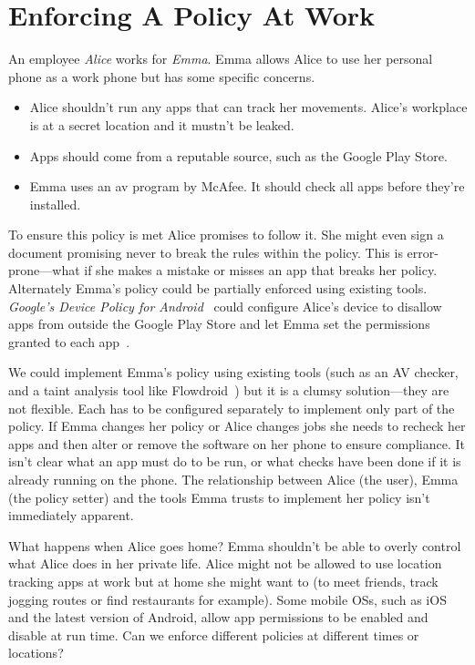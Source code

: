 \documentclass[]{llncs}
\begin{document}
\section{Enforcing A Policy At Work}
\label{sec:problem}

An employee \emph{Alice} works for \emph{Emma}.
Emma allows Alice to use her personal phone as a work phone but has some specific concerns.
\begin{itemize}
  \item Alice shouldn't run any apps that can track her movements.
    Alice's workplace is at a secret location and it mustn't be leaked.
  \item Apps should come from a reputable source, such as the Google Play Store.
  \item Emma uses an \ac{av} program by McAfee.
    It should check all apps before they're installed.
\end{itemize}

To ensure this policy is met Alice promises to follow it.
She might even sign a document promising never to break the rules within the policy.
This is error-prone---what if she makes a mistake or misses an app that breaks her policy.
Alternately Emma's policy could be partially enforced using existing tools.
\emph{Google's Device Policy for Android}~\cite{GoogleAppsDeviceP:tz} could configure Alice's device to disallow apps from outside the Google Play Store and let Emma set the permissions granted to each app~\cite{AndroidMPermission:2015uq}.

We could implement Emma's policy using existing tools (such as an AV checker, and a taint analysis tool like Flowdroid~\cite{Arzt:2014kf,Li:2015wo}) but it is a clumsy solution---they are not flexible.
Each has to be configured separately to implement only part of the policy.
If Emma changes her policy or Alice changes jobs she needs to recheck her apps and then alter or remove the software on her phone to ensure compliance.
It isn't clear what an app must do to be run, or what checks have been done if it is already running on the phone.
The relationship between Alice (the user), Emma (the policy setter) and the tools Emma trusts to implement her policy isn't immediately apparent.

What happens when Alice goes home?
Emma shouldn't be able to overly control what Alice does in her private life.
Alice might not be allowed to use location tracking apps at work but at home she might want to (to meet friends, track jogging routes or find restaurants for example).
Some mobile OSs, such as iOS and the latest version of Android, allow app permissions to be enabled and disable at run time.
Can we enforce different policies at different times or locations?
\end{document}
